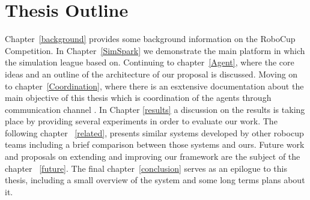 \section{Thesis Outline}
Chapter~\ref{background} provides some background information on the RoboCup Competition. In Chapter~\ref{SimSpark} we demonstrate the main platform in which the simulation league based on. Continuing to chapter~\ref{Agent}, where the core ideas and an outline of the architecture of our proposal is discussed. Moving on to chapter~\ref{Coordination}, where there is an esxtensive documentation about the main objective of this thesis which is coordination of the agents through communication channel . In Chapter \ref{results} a discussion on the results is taking place by providing several experiments in order to evaluate our work. The following chapter ~\ref{related}, presents similar systems developed by other robocup teams including a brief comparison between those systems and ours. Future work and proposals on extending and improving our framework are  the subject of the chapter ~\ref{future}. The final chapter~\ref{conclusion} serves as an epilogue to this thesis, including  a small overview of the system and some long terms plans about it.
